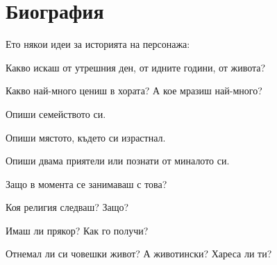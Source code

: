 \section{Биография}
Ето някои идеи за историята на персонажа:
\begin{itemize*}
\item{Какво искаш от утрешния ден, от идните години, от живота?}
\item{Какво най-много цениш в хората? А кое мразиш най-много?}
\item{Опиши семейството си.}
\item{Опиши мястото, където си израстнал.}
\item{Опиши двама приятели или познати от миналото си.}
\item{Защо в момента се занимаваш с това?}
\item{Коя религия следваш? Защо?}
\item{Имаш ли прякор? Как го получи?}
\item{Отнемал ли си човешки живот? А животински? Хареса ли ти?}
\end{itemize*}
